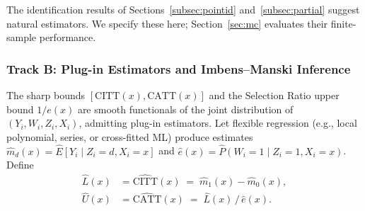 \documentclass[11pt]{article}
\begin{document}
The identification results of Sections~\ref{subsec:pointid}
and~\ref{subsec:partial} suggest natural estimators.  We specify these here;
Section~\ref{sec:mc} evaluates their finite-sample performance.

\subsubsection{Track B: Plug-in Estimators and Imbens--Manski Inference}

The sharp bounds $[\mathrm{CITT}(x), \mathrm{CATT}(x)]$ and the Selection Ratio
upper bound $1/e(x)$ are smooth functionals of the joint distribution of
$(Y_i, W_i, Z_i, X_i)$, admitting plug-in estimators.  Let flexible regression
(e.g., local polynomial, series, or cross-fitted ML) produce estimates
$\hat{m}_d(x) = \hat{E}[Y_i \mid Z_i=d, X_i=x]$ and $\hat{e}(x) =
\hat{P}(W_i=1 \mid Z_i=1, X_i=x)$.  Define
\begin{align}
  \hat{L}(x) &= \hat{\mathrm{CITT}}(x) \;=\; \hat{m}_1(x) - \hat{m}_0(x), \\
  \hat{U}(x) &= \hat{\mathrm{CATT}}(x) \;=\; \hat{L}(x)\,/\,\hat{e}(x).
\end{align}
\end{document}

